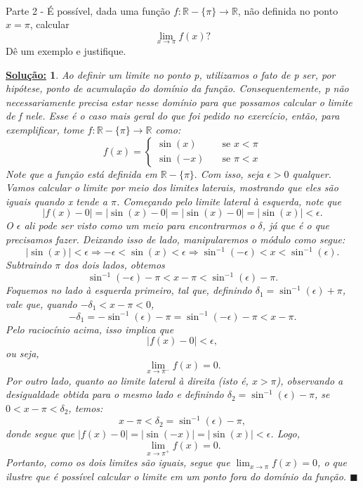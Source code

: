 \documentclass{article}
\newtheorem*{sol*}{\underline{Solu\c c\~ao:}}
\renewcommand\qedsymbol{$\blacksquare$}
\begin{document}
\paragraph{} Parte 2 - \'E poss\'ivel, dada uma fun\c c\~ao $f:\mathbb{R}-\{\pi\}\rightarrow \mathbb{R}$, n\~ao definida no ponto $x=\pi$, calcular 
$$
\lim_{x\to\pi}f(x)?
$$
D\^e um exemplo e justifique.
\begin{sol*}
Ao definir um limite no ponto p, utilizamos o fato de p ser, por hip\'otese, ponto de acumula\c c\~ao do dom\'inio da fun\c c\~ao. Consequentemente, p n\~ao necessariamente precisa estar nesse dom\'inio para que possamos calcular o limite de f nele. Esse \'e o caso mais geral do que foi pedido no exerc\'icio, ent\~ao, para exemplificar, tome $f:\mathbb{R}-\{\pi\}\rightarrow\mathbb{R}$ como:
$$
f(x) = \left\{\begin{array}{ll}
	\sin(x) & \quad \text{se } x < \pi \\
	\sin(-x) & \quad \text{se } \pi < x
\end{array}\right.
$$
Note que a fun\c c\~ao est\'a definida em $\mathbb{R}-\{\pi\}.$ Com isso, seja $\epsilon > 0$ qualquer. Vamos calcular o limite por meio dos limites laterais, mostrando que eles s\~ao iguais quando x tende a $\pi$. Come\c cando pelo limite lateral \`a esquerda, note que
$$
|f(x) - 0| = |\sin(x) - 0| = |\sin(x) - 0| = |\sin(x)|< \epsilon.
$$
O $\epsilon$ ali pode ser visto como um meio para encontrarmos o $\delta$, j\'a que \'e o que precisamos fazer. Deixando isso de lado, manipularemos o m\'odulo como segue:
$$
|\sin(x)| < \epsilon \Rightarrow -\epsilon < \sin(x) < \epsilon \Rightarrow \sin^{-1}(-\epsilon) < x < \sin^{-1}(\epsilon).
$$
Subtraindo $\pi$ dos dois lados, obtemos
$$
\sin^{-1}(-\epsilon) - \pi < x - \pi < \sin^{-1}(\epsilon) - \pi.
$$
Foquemos no lado \`a esquerda primeiro, tal que, definindo $\delta_1 = \sin^{-1}(\epsilon) + \pi$, vale que, quando $-\delta_1 < x - \pi < 0$, 
$$
-\delta_1 = -\sin^{-1}(\epsilon) - \pi = \sin^{-1}(-\epsilon) - \pi < x - \pi.
$$
Pelo racioc\'inio acima, isso implica que 
$$
|f(x) - 0| < \epsilon,
$$
ou seja, 
$$
\lim_{x\to\pi^{-}}f(x) = 0.
$$
Por outro lado, quanto ao limite lateral \`a direita (isto \'e, $x > \pi$), observando a desigualdade obtida para o mesmo lado e definindo $\delta_2 = \sin^{-1}(\epsilon) - \pi $, se $0 < x - \pi < \delta_2$, temos:
$$
x - \pi < \delta_2 = \sin^{-1}(\epsilon) - \pi,
$$
donde segue que $|f(x) - 0| = |\sin(-x)| = |\sin(x)| < \epsilon$. Logo,
$$
\lim_{x\to\pi^{+}}f(x) = 0.
$$
Portanto, como os dois limites s\~ao iguais, segue que $\lim_{x\to\pi} f(x) = 0$, o que ilustre que \'e poss\'ivel calcular o limite em um ponto fora do dom\'inio da fun\c c\~ao.
\qedsymbol
\end{sol*}
\end{document}
